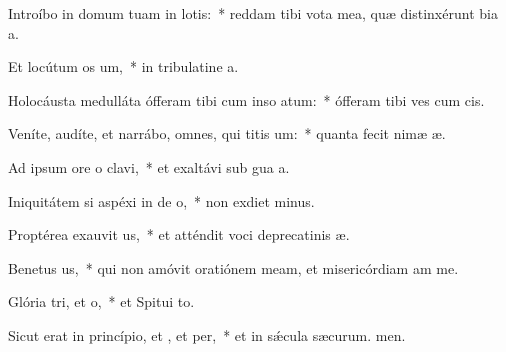 \item Introíbo in domum tuam in lotis:~* reddam tibi vota mea, quæ distinxérunt bia a.
\item Et locútum  os um,~* in tribulatine a.
\item Holocáusta medulláta ófferam tibi cum inso atum:~* ófferam tibi ves cum cis.
\item Veníte, audíte, et narrábo, omnes, qui titis um:~* quanta fecit nimæ æ.
\item Ad ipsum ore o clavi,~* et exaltávi sub gua a.
\item Iniquitátem si aspéxi in de o,~* non exdiet minus.
\item Proptérea exauvit us,~* et atténdit voci deprecatinis æ.
\item Benetus us,~* qui non amóvit oratiónem meam, et misericórdiam am  me.
\item Glória tri, et o,~* et Spitui to.
\item Sicut erat in princípio, et , et per,~* et in sǽcula sæcurum. men.
